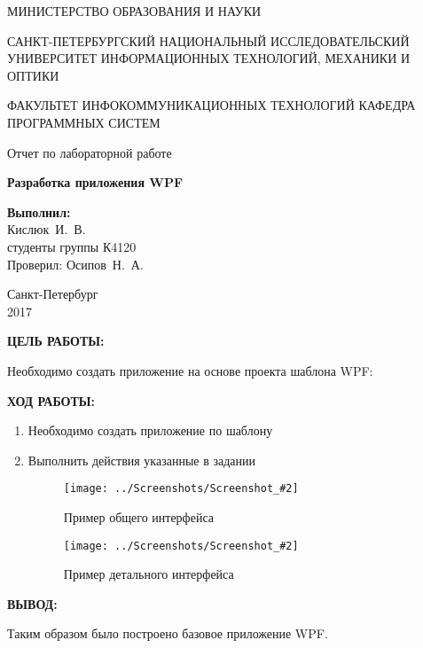 \documentclass[14pt,a4paper]{extreport}
\newcommand{\screenshot}[2]{\begin{figure}[ht]%
\centering\texttt{[image: ../Screenshots/Screenshot\_\#2]}%
\caption{#1}%
\label{picture#2}%
\end{figure}%
}
\newcommand{\header}[1]{%
{
\fontsize{16pt}{14pt}\selectfont
\begin{center}
\textbf{\MakeUppercase{#1}:}
\end{center}
}
}
\newcommand{\osipov}{Осипов~Н.~А.}
\newcommand{\igork}{Кислюк~И.~В.}
\begin{document}
	\begin{titlepage}
	\begin{center}	
		\fontsize{14pt}{14pt}\selectfont
		МИНИСТЕРСТВО ОБРАЗОВАНИЯ И НАУКИ\\

		\vspace*{0.6\baselineskip}
		
		САНКТ-ПЕТЕРБУРГСКИЙ НАЦИОНАЛЬНЫЙ ИССЛЕДОВАТЕЛЬСКИЙ УНИВЕРСИТЕТ ИНФОРМАЦИОННЫХ ТЕХНОЛОГИЙ, МЕХАНИКИ И ОПТИКИ
		
		\vspace*{0.6\baselineskip}
		ФАКУЛЬТЕТ ИНФОКОММУНИКАЦИОННЫХ ТЕХНОЛОГИЙ
		КАФЕДРА ПРОГРАММНЫХ СИСТЕМ
	
		\vspace*{7\baselineskip}
		\fontsize{19pt}{18pt}\selectfont
		Отчет по лабораторной работе
		
		\fontsize{20pt}{18pt}\selectfont
		\textbf{Разработка приложения WPF}\\
		\vspace*{1.15\baselineskip}
		\end{center}
	
	\vspace*{2\baselineskip}
	\begin{flushright}
	\fontsize{14pt}{14pt}\selectfont
	\textbf{Выполнил:}\\
	\igork\\
	студенты группы К4120\\
	Проверил: \osipov\\
	\end{flushright}
	
	\vspace{\fill}
	\begin{center}
	Санкт-Петербург\\
	2017
	\end{center}
	
\end{titlepage}

\newpage

\header{Цель работы}

\fontsize{14pt}{14pt}\selectfont

Необходимо создать приложение на основе проекта шаблона WPF:

\clearpage

\header{Ход работы}

\begin{enumerate}

\item Необходимо создать приложение по шаблону
\item Выполнить действия указанные в задании


\screenshot{Пример общего интерфейса}{5}
\screenshot{Пример детального интерфейса}{7}

\end{enumerate}

\clearpage

\header{Вывод}

Таким образом было построено базовое приложение WPF.
\end{document}
